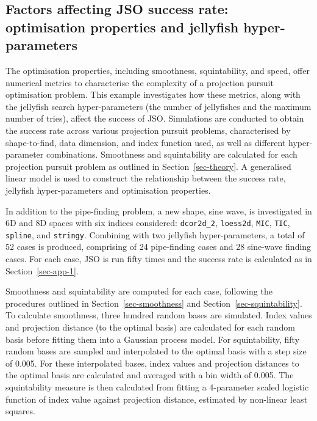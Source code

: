 \documentclass[
  number,
  preprint,
  3p]{elsarticle}
\begin{document}
\hypertarget{sec-app-2}{%
\subsection{Factors affecting JSO success rate: optimisation properties
and jellyfish hyper-parameters}\label{sec-app-2}}

The optimisation properties, including smoothness, squintability, and
speed, offer numerical metrics to characterise the complexity of a
projection pursuit optimisation problem. This example investigates how
these metrics, along with the jellyfish search hyper-parameters (the
number of jellyfishes and the maximum number of tries), affect the
success of JSO. Simulations are conducted to obtain the success rate
across various projection pursuit problems, characterised by
shape-to-find, data dimension, and index function used, as well as
different hyper-parameter combinations. Smoothness and squintability are
calculated for each projection pursuit problem as outlined in
Section~\ref{sec-theory}. A generalised linear model is used to
construct the relationship between the success rate, jellyfish
hyper-parameters and optimisation properties.

In addition to the pipe-finding problem, a new shape, sine wave, is
investigated in 6D and 8D spaces with six indices considered:
\texttt{dcor2d\_2}, \texttt{loess2d}, \texttt{MIC}, \texttt{TIC},
\texttt{spline}, and \texttt{stringy}. Combining with two jellyfish
hyper-parameters, a total of 52 cases is produced, comprising of 24
pipe-finding cases and 28 sine-wave finding cases. For each case, JSO is
run fifty times and the success rate is calculated as in
Section~\ref{sec-app-1}.

Smoothness and squintability are computed for each case, following the
procedures outlined in Section~\ref{sec-smoothness} and
Section~\ref{sec-squintability}. To calculate smoothness, three hundred
random bases are simulated. Index values and projection distance (to the
optimal basis) are calculated for each random basis before fitting them
into a Gaussian process model. For squintability, fifty random bases are
sampled and interpolated to the optimal basis with a step size of 0.005.
For these interpolated bases, index values and projection distances to
the optimal basis are calculated and averaged with a bin width of 0.005.
The squintability measure is then calculated from fitting a 4-parameter
scaled logistic function of index value against projection distance,
estimated by non-linear least squares.
\end{document}
